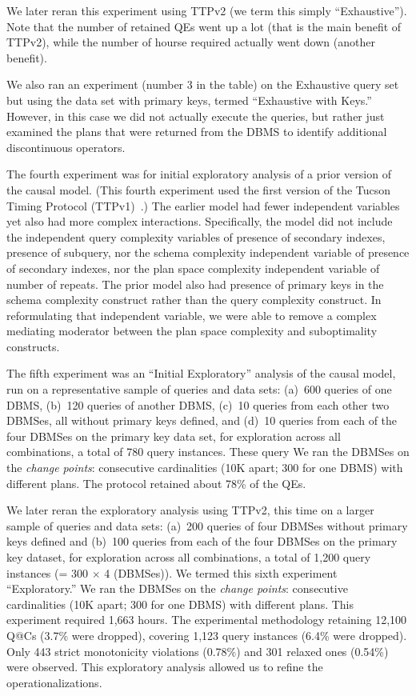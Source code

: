 \documentclass[prodmode,acmtods]{acmsmall}
\makeatletter
\def\QatC{Q{@}C}
\makeatother
\begin{document}
We later reran this experiment using TTPv2 (we term this simply
``Exhaustive''). Note that the number of retained QEs went up a lot (that is
the main benefit of TTPv2), while the number of hourse required actually
went down (another benefit).

We also ran an experiment (number 3 in the table) on the Exhaustive query set but using the data
set with primary keys, termed ``Exhaustive with Keys.'' However, in this
case we did not actually execute 
the queries, but rather just examined the plans that were returned from the
\hbox{DBMS} to identify additional discontinuous operators. 

The fourth experiment was for initial exploratory analysis of a prior
version of the causal model. (This fourth experiment used
the first version of the Tucson Timing Protocol (TTPv1)~\cite{TTPv1}.)
The earlier model had fewer independent
variables yet also had more complex interactions. Specifically, the model
did not include the independent query complexity variables of presence of
secondary indexes, presence of subquery, nor the schema complexity
independent variable of presence of secondary indexes, nor the plan space
complexity independent variable of number of repeats. The prior model also
had presence of primary keys in the schema complexity construct rather than
the query complexity construct. In reformulating that independent variable,
we were able to remove a complex mediating moderator between the plan
space complexity and suboptimality constructs. 

The fifth experiment was an ``Initial Exploratory'' analysis of the causal model, run on
a representative sample of queries and data sets: (a)~600 queries of one
\hbox{DBMS}, (b)~120 queries of another \hbox{DBMS}, (c)~10 queries
from each other two \hbox{DBMSes}, all without primary keys defined, and (d)~10 queries
from each of the four \hbox{DBMSes} on the primary key data set, for exploration
across all combinations, a total of 780 query instances. These query
We ran the \hbox{DBMSes} on the {\em
  change points}: consecutive cardinalities (10K apart; 300 for one \hbox{DBMS}) with different
plans. The protocol retained about 78\% of the QEs.

We later reran the exploratory analysis using TTPv2, this time on a larger sample of queries and data sets:
(a)~200 queries of four \hbox{DBMSes} without primary keys defined and
(b)~100 queries from each of the four \hbox{DBMSes} on the primary key dataset,
for exploration across all combinations, a total of 1,200 query instances (= 300 $\times$ 4 (DBMSes)).
We termed this sixth experiment ``Exploratory.''  We ran the DBMSes on the {\em
  change points}: consecutive cardinalities (10K apart; 300 for one DBMS) with different
plans. This experiment required 1,663 hours. The experimental
methodology retaining 12,100 {\QatC}s (3.7\% were dropped), covering 1,123 query
instances (6.4\% were dropped). Only 443 strict monotonicity violations (0.78\%) and 301 relaxed
ones (0.54\%) were observed. This exploratory analysis allowed us to refine
the operationalizations.
\end{document}
